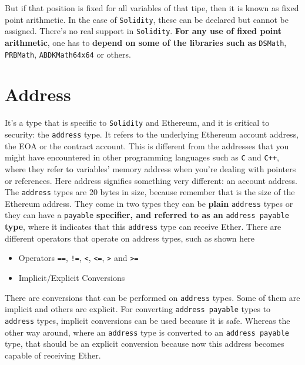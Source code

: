 But if that position is fixed for all variables of that tipe, then it is known as fixed point arithmetic. In the case of \texttt{Solidity}, these can be declared but cannot be assigned. There's no real support in \texttt{Solidity}. \textbf{For any use of fixed point arithmetic}, one has to \textbf{depend on some of the libraries such as} \texttt{DSMath}, \texttt{PRBMath}, \texttt{ABDKMath64x64} or others.\\

\section{Address}
It's a type that is specific to \texttt{Solidity} and Ethereum, and it is critical to security: the \texttt{address} type. It refers to the underlying Ethereum account address, the EOA or the contract account. This is different from the addresses that you might have encountered in other programming languages such as \texttt{C} and \texttt{C++}, where they refer to variables' memory address when you're dealing with pointers or references. Here address signifies something very different: an account address.\\

The \texttt{address} types are 20 bytes in size, because remember that is the size of the Ethereum address. They come in two types they can be \textbf{plain} \texttt{address} types or they can have a \texttt{payable} \textbf{specifier, and referred to as an} \texttt{address payable} \textbf{type}, where it indicates that this \texttt{address} type can receive Ether. There are different operators that operate on address types, such as shown here

\begin{itemize}
\item Operators \texttt{==}, \texttt{!=}, \texttt{<}, \texttt{<=}, \texttt{>} and \texttt{>=}
\item Implicit/Explicit Conversions
\end{itemize}

There are conversions that can be performed on \texttt{address} types. Some of them are implicit and others are explicit. For converting \texttt{address payable} types to \texttt{address} types, implicit conversions can be used because it is safe. Whereas the other way around, where an \texttt{address} type is converted to an \texttt{address payable} type, that should be an explicit conversion because now this address becomes capable of receiving Ether.\\

